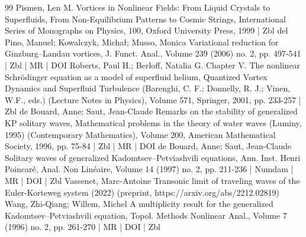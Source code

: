 \documentclass[10pt]{amsart}
\theoremstyle{definition}\newtheorem{defi}[theo]{Definition}\newtheorem{rema}[theo]{Remark}\newtheorem{exam}[theo]{Example}\newtheorem{exem}[theo]{Example}\newtheorem{nota}[theo]{Notation}
\begin{document}
\begin{thebibliography}{99}
Pismen, Len M. Vortices in Nonlinear Fields: From Liquid Crystals to Superfluids, From Non-Equilibrium Patterns to Cosmic Strings, International Series of Monographs on Physics, 100, Oxford University Press, 1999 | Zbl
del Pino, Manuel; Kowalczyk, Michał; Musso, Monica Variational reduction for Ginzburg–Landau vortices, J. Funct. Anal., Volume 239 (2006) no. 2, pp. 497-541 | Zbl | MR | DOI
Roberts, Paul H.; Berloff, Natalia G. Chapter V. The nonlinear Schrödinger equation as a model of superfluid helium, Quantized Vortex Dynamics and Superfluid Turbulence (Barenghi, C. F.; Donnelly, R. J.; Vinen, W.F., eds.) (Lecture Notes in Physics), Volume 571, Springer, 2001, pp. 233-257 | Zbl
de Bouard, Anne; Saut, Jean-Claude Remarks on the stability of generalized KP solitary waves, Mathematical problems in the theory of water waves (Luminy, 1995) (Contemporary Mathematics), Volume 200, American Mathematical Society, 1996, pp. 75-84 | Zbl | MR | DOI
de Bouard, Anne; Saut, Jean-Claude Solitary waves of generalized Kadomtsev–Petviashvili equations, Ann. Inst. Henri Poincaré, Anal. Non Linéaire, Volume 14 (1997) no. 2, pp. 211-236 | Numdam | MR | DOI | Zbl
Vassenet, Marc-Antoine Transonic limit of traveling waves of the Euler-Korteweg system (2022) (preprint, https://arxiv.org/abs/2212.02819)
Wang, Zhi-Qiang; Willem, Michel A multiplicity result for the generalized Kadomtsev–Petviashvili equation, Topol. Methods Nonlinear Anal., Volume 7 (1996) no. 2, pp. 261-270 | MR | DOI | Zbl
\end{thebibliography}
\end{document}
